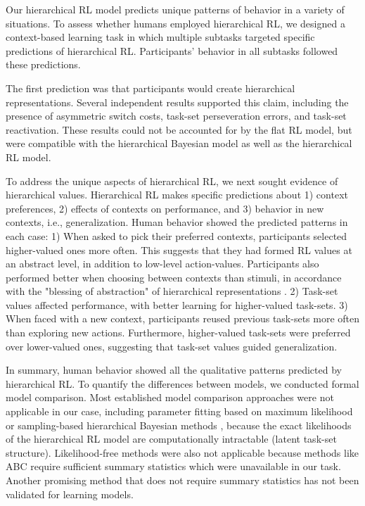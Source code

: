 \documentclass[10pt,letterpaper]{article}  %
\begin{document}
Our hierarchical RL model predicts unique patterns of behavior in a variety of situations. 
To assess whether humans employed hierarchical RL, we designed a context-based learning task in which multiple subtasks targeted specific predictions of hierarchical RL. Participants' behavior in all subtasks followed these predictions.

The first prediction was that participants would create hierarchical representations. Several independent results supported this claim, including the presence of asymmetric switch costs, task-set perseveration errors, and task-set reactivation. 
These results could not be accounted for by the flat RL model, but were compatible with the hierarchical Bayesian model as well as the hierarchical RL model.

To address the unique aspects of hierarchical RL, we next sought evidence of hierarchical values.
Hierarchical RL makes specific predictions about 1) context preferences, 2) effects of contexts on performance, and 3) behavior in new contexts, i.e., generalization.
Human behavior showed the predicted patterns in each case: 
1) When asked to pick their preferred contexts, participants selected higher-valued ones more often. This suggests that they had formed RL values at an abstract level, in addition to low-level action-values. 
Participants also performed better when choosing between contexts than stimuli, in accordance with the "blessing of abstraction" of hierarchical representations \cite{gershman_blessing_2017, kemp_learning_2007}.
2) Task-set values affected performance, with better learning for higher-valued task-sets.
3) When faced with a new context, participants reused previous task-sets more often than exploring new actions. Furthermore, higher-valued task-sets were preferred over lower-valued ones, suggesting that task-set values guided generalization.

In summary, human behavior showed all the qualitative patterns predicted by hierarchical RL. To quantify the differences between models, we conducted formal model comparison.
Most established model comparison approaches were not applicable in our case, including parameter fitting based on maximum likelihood or sampling-based hierarchical Bayesian methods \cite{daw_trial-by-trial_2011, wilson_ten_2019}, because the exact likelihoods of the hierarchical RL model are computationally intractable (latent task-set structure). Likelihood-free methods \cite{sunnaker_approximate_2013, turner_tutorial_2012} were also not applicable because methods like ABC require sufficient summary statistics which were unavailable in our task. Another promising method that does not require summary statistics \cite{turner_generalized_2014} has not been validated for learning models. 
\end{document}
